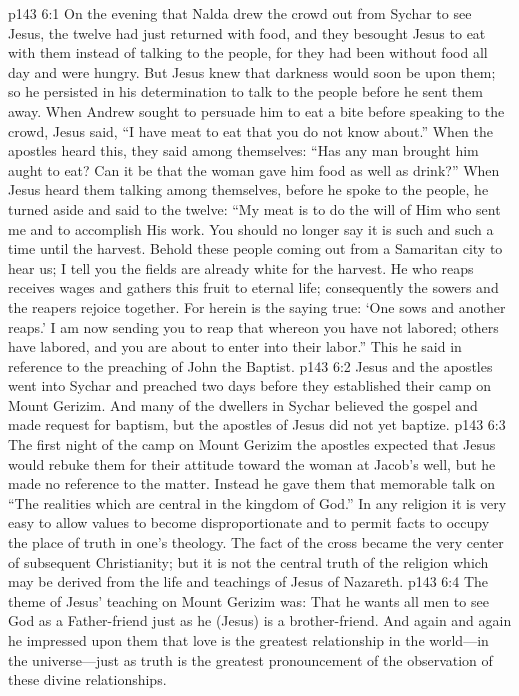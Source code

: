 \vs p143 6:1 On the evening that Nalda drew the crowd out from Sychar to see Jesus, the twelve had just returned with food, and they besought Jesus to eat with them instead of talking to the people, for they had been without food all day and were hungry. But Jesus knew that darkness would soon be upon them; so he persisted in his determination to talk to the people before he sent them away. When Andrew sought to persuade him to eat a bite before speaking to the crowd, Jesus said, \textcolor{ubdarkred}{“I have meat to eat that you do not know about.”} When the apostles heard this, they said among themselves: “Has any man brought him aught to eat? Can it be that the woman gave him food as well as drink?” When Jesus heard them talking among themselves, before he spoke to the people, he turned aside and said to the twelve: \textcolor{ubdarkred}{“My meat is to do the will of Him who sent me and to accomplish His work. You should no longer say it is such and such a time until the harvest. Behold these people coming out from a Samaritan city to hear us; I tell you the fields are already white for the harvest. He who reaps receives wages and gathers this fruit to eternal life; consequently the sowers and the reapers rejoice together. For herein is the saying true: ‘One sows and another reaps.’ I am now sending you to reap that whereon you have not labored; others have labored, and you are about to enter into their labor.”} This he said in reference to the preaching of John the Baptist.
\vs p143 6:2 Jesus and the apostles went into Sychar and preached two days before they established their camp on Mount Gerizim. And many of the dwellers in Sychar believed the gospel and made request for baptism, but the apostles of Jesus did not yet baptize.\plusone
\pc \vs p143 6:3 The first night of the camp on Mount Gerizim the apostles expected that Jesus would rebuke them for their attitude toward the woman at Jacob’s well, but he made no reference to the matter. Instead he gave them that memorable talk on “The realities which are central in the kingdom of God.” In any religion it is very easy to allow values to become disproportionate and to permit facts to occupy the place of truth in one’s theology. The fact of the cross became the very center of subsequent Christianity; but it is not the central truth of the religion which may be derived from the life and teachings of Jesus of Nazareth.
\vs p143 6:4 The theme of Jesus’ teaching on Mount Gerizim was: That he wants all men to see God as a Father\hyp{}friend just as he (Jesus) is a brother\hyp{}friend. And again and again he impressed upon them that love is the greatest relationship in the world---in the universe---just as truth is the greatest pronouncement of the observation of these divine relationships.
